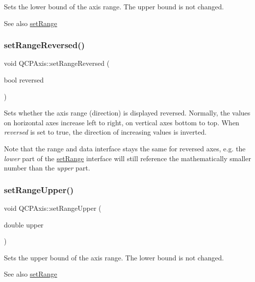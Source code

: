 Sets the lower bound of the axis range. The upper bound is not changed. \begin{DoxySeeAlso}{See also}
\mbox{\hyperlink{class_q_c_p_axis_aebdfea5d44c3a0ad2b4700cd4d25b641}{set\+Range}} 
\end{DoxySeeAlso}
\mbox{\label{class_q_c_p_axis_a2172fdb196b1a0dc3f40992fcad8e9e1}} 
\subsubsection{\texorpdfstring{setRangeReversed()}{setRangeReversed()}}
{\footnotesize\ttfamily void Q\+C\+P\+Axis\+::set\+Range\+Reversed (\begin{DoxyParamCaption}\item[{bool}]{reversed }\end{DoxyParamCaption})}

Sets whether the axis range (direction) is displayed reversed. Normally, the values on horizontal axes increase left to right, on vertical axes bottom to top. When {\itshape reversed} is set to true, the direction of increasing values is inverted.

Note that the range and data interface stays the same for reversed axes, e.\+g. the {\itshape lower} part of the \mbox{\hyperlink{class_q_c_p_axis_aebdfea5d44c3a0ad2b4700cd4d25b641}{set\+Range}} interface will still reference the mathematically smaller number than the {\itshape upper} part. \mbox{\label{class_q_c_p_axis_acd3ca1247aa867b540cd5ec30ccd3bef}} 
\subsubsection{\texorpdfstring{setRangeUpper()}{setRangeUpper()}}
{\footnotesize\ttfamily void Q\+C\+P\+Axis\+::set\+Range\+Upper (\begin{DoxyParamCaption}\item[{double}]{upper }\end{DoxyParamCaption})}

Sets the upper bound of the axis range. The lower bound is not changed. \begin{DoxySeeAlso}{See also}
\mbox{\hyperlink{class_q_c_p_axis_aebdfea5d44c3a0ad2b4700cd4d25b641}{set\+Range}} 
\end{DoxySeeAlso}
\mbox{\label{class_q_c_p_axis_af4bbd446dcaee5a83ac30ce9bcd6e125}} 
